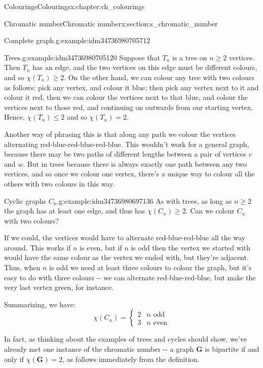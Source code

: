 \documentclass[oneside,10pt,]{book}
\numberwithin{equation}{section}
\newcommand{\bfG}{\mathbf{G}}
\begin{document}
\begin{chapterptx}{Colourings}{}{Colourings}{}{}{x:chapter:ch_colourings}
\begin{sectionptx}{Chromatic number}{}{Chromatic number}{}{}{x:section:s_chromatic_number}
\begin{example}{Complete graph.}{g:example:idm34736980705712}
\end{example}
\begin{example}{Trees.}{g:example:idm34736980705120}%
Suppose that \(T_n\) is a tree on \(n\geq 2\) vertices.  Then \(T_n\) has an edge, and the two vertices on this edge must be different colours, and so \(\chi(T_n)\geq 2\).  On the other hand, we can colour any tree with two colours as follows: pick any vertex, and colour it blue; then pick any vertex next to it and colour it red, then we can colour the vertices next to that blue, and colour the vertices next to those red, and continuing on outwards from our starting vertex.  Hence, \(\chi(T_n)\leq 2\) and so \(\chi(T_n)=2\).%
\par
Another way of phrasing this is that along any path we colour the vertices alternating red-blue-red-blue-red-blue.  This wouldn't work for a general graph, because there may be two paths of different lengths between a pair of vertices \(v\) and \(w\).  But in trees because there is always exactly one path between any two vertices, and so once we colour one vertex, there's a unique way to colour all the others with two colours in this way.%
\end{example}
\begin{example}{Cyclic graphs \(C_n\).}{g:example:idm34736980697136}%
As with trees, as long as \(n\geq 2\) the graph has at least one edge, and thus has \(\chi(C_n)\geq 2\).  Can we colour \(C_n\) with two colours?%
\par
If we could, the vertices would have to alternate red-blue-red-blue all the way around.  This works if \(n\) is even, but if \(n\) is odd then the vertex we started with would have the same colour as the vertex we ended with, but they're adjacent.  Thus, when \(n\) is odd we need at least three colours to colour the graph, but it's easy to do with three colours -{}-{} we can alternate red-blue-red-blue, but make the very last vertex green, for instance.%
\par
Summarizing, we have:%
\begin{equation*}
\chi(C_n)=\begin{cases} 2 & n \text{ odd} \\ 3 & n \text{ even} \end{cases}
\end{equation*}
%
\end{example}
In fact, as thinking about the examples of trees and cycles should show, we've already met one instance of the chromatic number -{}-{} a graph \(\bfG\) is bipartite if and only if \(\chi(\bfG)=2\), as follows immediately from the definition.%

\end{sectionptx}
\end{chapterptx}
\end{document}
